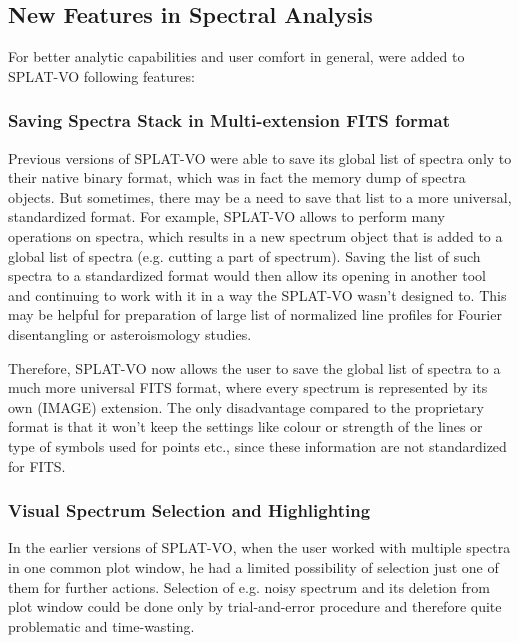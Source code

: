 \documentclass[final,authoryear,5p,times,twocolumn]{elsarticle}
\begin{document}
\subsection{New Features in Spectral Analysis} 

\label{davids_functions} 
For better analytic capabilities and user comfort in
general, were added \citep{and146bcthesis} to SPLAT-VO following features:

\subsubsection{Saving Spectra Stack in Multi-extension FITS format}

Previous versions of SPLAT-VO were able to save its global list of spectra only to
their native binary format, which was in fact the memory dump of spectra
objects. But sometimes, there may be a need to save that list to a more
universal, standardized format. For example, SPLAT-VO allows to perform many
operations on spectra, which results in a new spectrum object that is added to
a global list of spectra (e.g. cutting a part of spectrum). Saving the list of
such spectra to a standardized format would then allow its opening in another
tool and continuing to work with it in a way the SPLAT-VO wasn't designed to.
This may be helpful for preparation of large list of normalized line profiles
for Fourier disentangling or asteroismology studies.

Therefore, SPLAT-VO now allows the user to save the global list of spectra to a
much more universal FITS format, where every spectrum  is represented by its
own (IMAGE) extension.  The only disadvantage compared to the proprietary
format is that it won't keep the settings like colour or strength of the lines
or type of symbols used for points etc., since these information  are not
standardized for FITS.


\subsubsection{Visual Spectrum Selection and Highlighting}

In the earlier versions of SPLAT-VO, when the user worked with multiple
spectra in one common plot window, he  had a limited possibility of
selection just one of them for further actions. Selection of e.g. noisy
spectrum and its deletion from plot window could be done only by
trial-and-error procedure and therefore quite problematic and time-wasting.
\end{document}
